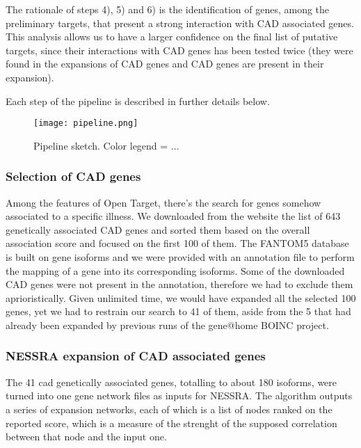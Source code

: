 \documentclass[fleqn,10pt]{SelfArx} %
\begin{document}
The rationale of steps 4), 5) and 6) is the identification of genes, among the preliminary targets, that present a strong interaction with CAD associated genes. This analysis allows us to have a larger confidence on the final list of putative targets, since their interactions with CAD genes has been tested twice (they were found in the expansions of CAD genes and CAD genes are present in their expansion).

Each step of the pipeline is described in further details below.
 
\cite{OpenTargetPlatform}
\cite{fantom}
\cite{realBoinc}
\cite{WGS}

\begin{figure}
	\texttt{[image: pipeline.png]}
	\caption{Pipeline sketch. Color legend = ...}
	\label{Fig:pipe}
\end{figure}

\subsubsection{Selection of CAD genes}
Among the features of Open Target, there's the search for genes somehow associated to a specific illness. 
We downloaded from the website the list of 643 genetically associated CAD genes and sorted them based on the overall association score and focused on the first 100 of them. 
The FANTOM5 database is built on gene isoforms and we were provided with an annotation file to perform the mapping of a gene into its corresponding isoforms.
Some of the downloaded CAD genes were not present in the annotation, therefore we had to exclude them aprioristically.
Given unlimited time, we would have expanded all the selected 100 genes, yet we had to restrain our search to 41 of them, aside from the 5 that had already been expanded by previous runs of the gene@home BOINC project.

\subsubsection{NESSRA expansion of CAD associated genes}
The 41 cad genetically associated genes, totalling to about 180 isoforms, were turned into one gene network files as inputs for NESSRA.
The algorithm outputs a series of expansion networks, each of which is a list of nodes ranked on the reported score, which is a measure of the strenght of the supposed correlation between that node and the input one. 
\end{document}
